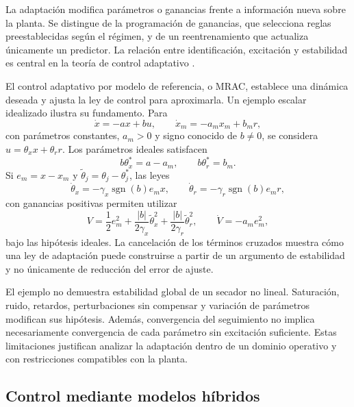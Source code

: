 La adaptación modifica parámetros o ganancias frente a información nueva sobre la planta. Se distingue de la programación de ganancias, que selecciona reglas preestablecidas según el régimen, y de un reentrenamiento que actualiza únicamente un predictor. La relación entre identificación, excitación y estabilidad es central en la teoría de control adaptativo \cite{astrom1995}.

El control adaptativo por modelo de referencia, o MRAC, establece una dinámica deseada y ajusta la ley de control para aproximarla. Un ejemplo escalar idealizado ilustra su fundamento. Para
\begin{equation}
\dot x=-ax+bu,
\qquad
\dot x_m=-a_mx_m+b_mr,
\label{eq:mrac_planta_referencia}
\end{equation}
con parámetros constantes, $a_m>0$ y signo conocido de $b\neq0$, se considera $u=\theta_xx+\theta_rr$. Los parámetros ideales satisfacen
\begin{equation}
b\theta_x^{*}=a-a_m,
\qquad
b\theta_r^{*}=b_m.
\label{eq:mrac_matching}
\end{equation}
Si $e_m=x-x_m$ y $\widetilde\theta_j=\theta_j-\theta_j^{*}$, las leyes
\begin{equation}
\dot\theta_x=-\gamma_x\operatorname{sgn}(b)e_mx,
\qquad
\dot\theta_r=-\gamma_r\operatorname{sgn}(b)e_mr,
\label{eq:mrac_adaptacion}
\end{equation}
con ganancias positivas permiten utilizar
\begin{equation}
V=\frac12e_m^2
+\frac{|b|}{2\gamma_x}\widetilde\theta_x^2
+\frac{|b|}{2\gamma_r}\widetilde\theta_r^2,
\qquad
\dot V=-a_me_m^2,
\label{eq:mrac_lyapunov}
\end{equation}
bajo las hipótesis ideales. La cancelación de los términos cruzados muestra cómo una ley de adaptación puede construirse a partir de un argumento de estabilidad y no únicamente de reducción del error de ajuste.

El ejemplo no demuestra estabilidad global de un secador no lineal. Saturación, ruido, retardos, perturbaciones sin compensar y variación de parámetros modifican sus hipótesis. Además, convergencia del seguimiento no implica necesariamente convergencia de cada parámetro sin excitación suficiente. Estas limitaciones justifican analizar la adaptación dentro de un dominio operativo y con restricciones compatibles con la planta.

\subsection{Control mediante modelos híbridos}

